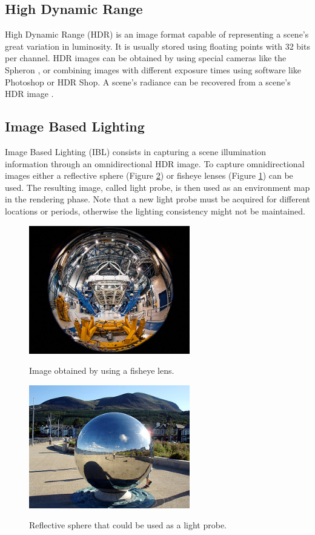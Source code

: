 \documentclass[conference]{acmsiggraph}
\begin{document}
\subsection{High Dynamic Range}

	High Dynamic Range (HDR) is an image format capable of representing a scene’s great variation in luminosity. It is usually stored using floating points with 32 bits per channel. 
	HDR images can be obtained by using special cameras like the Spheron \cite{spheron}, or combining images with different exposure times using software like Photoshop or HDR Shop. 
	A scene’s radiance can be recovered from a scene’s HDR image \cite{debevec1997}.

\subsection{Image Based Lighting}

	Image Based Lighting (IBL) \cite{debevec2002} consists in capturing a scene illumination information through an omnidirectional HDR image. To capture omnidirectional images either 
	a reflective sphere (Figure \ref{fig:lightprobe}\cite{linda}) or fisheye lenses (Figure \ref{fig:fisheye}\cite{salgado}) can be used. The resulting image, called light probe, is then used as an environment 
	map in the rendering phase. Note that a new light probe must be acquired for different locations or periods, otherwise the lighting consistency might not be maintained.

	\begin{figure}[!ht]
		\caption{Image obtained by using a fisheye lens.}
		\centering
		\includegraphics[width=7cm]{images/fisheye.jpg}
		\label{fig:fisheye}
	\end{figure}

	\begin{figure}[!ht]
		\caption{Reflective sphere that could be used as a light probe.}
		\centering
		\includegraphics[width=7cm]{images/lightprobe.jpg}
		\label{fig:lightprobe}
	\end{figure}
\end{document}
